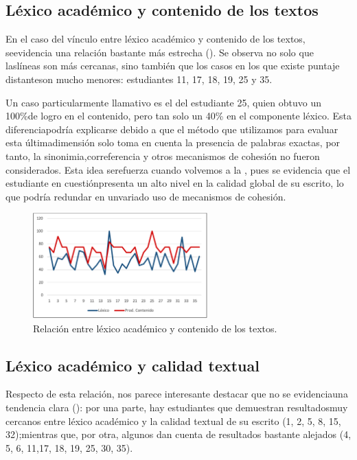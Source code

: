 \documentclass{textolivre}
\begin{document}
\subsection{Léxico académico y contenido de los textos}\label{sec-contenido}
En el caso del vínculo entre léxico académico y contenido de los textos,
seevidencia una relación bastante más estrecha (). Se observa no solo
que laslíneas son más cercanas, sino también que los casos en los que existe
puntaje distanteson mucho menores: estudiantes 11, 17, 18, 19, 25 y 35.

Un caso particularmente llamativo es el del estudiante 25, quien obtuvo un
100\%de logro en el contenido, pero tan solo un 40\% en el componente léxico.
Esta diferenciapodría explicarse debido a que el método que utilizamos para
evaluar esta últimadimensión solo toma en cuenta la presencia de palabras
exactas, por tanto, la sinonimia,correferencia y otros mecanismos de cohesión
no fueron considerados. Esta idea serefuerza cuando volvemos a la ,
pues se evidencia que el estudiante en cuestiónpresenta un alto nivel en la
calidad global de su escrito, lo que podría redundar en unvariado uso de
mecanismos de cohesión.

\begin{figure}[htbp]
 \centering
 \includegraphics[width=0.6\textwidth]{figure03.png}
 \caption{Relación entre léxico académico y contenido de los textos.}
 \label{fig03}
\end{figure}


\subsection{Léxico académico y calidad textual}\label{sec-calidad}
Respecto de esta relación, nos parece interesante destacar que no se
evidenciauna tendencia clara (): por una parte, hay estudiantes que
demuestran resultadosmuy cercanos entre léxico académico y la calidad textual
de su escrito (1, 2, 5, 8, 15, 32);mientras que, por otra, algunos dan cuenta
de resultados bastante alejados (4, 5, 6, 11,17, 18, 19, 25, 30, 35).
\end{document}
